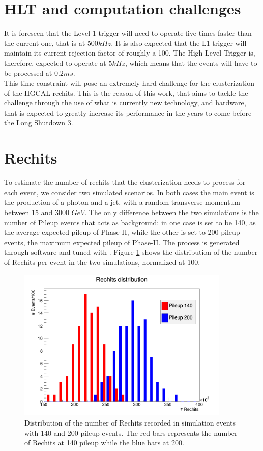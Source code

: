 \section{HLT and computation challenges}
It is foreseen that the Level 1 trigger will need to operate five times faster than the current one, that is at $500 \unit{kHz}$. It is also expected that the L1 trigger will maintain its current rejection factor of roughly a 100. The High Level Trigger is, therefore, expected to operate at $5 \unit{kHz}$, which means that the events will have to be processed at $0.2 \unit{ms}$.\\
This time constraint will pose an extremely hard challenge for the clusterization of the HGCAL rechits. This is the reason of this work, that aims to tackle the challenge through the use of what is currently new technology, and hardware, that is expected to greatly increase its performance in the years to come before the Long Shutdown 3.

\section{Rechits}
To estimate the number of rechits that the clusterization needs to process for each event, we consider two simulated scenarios.
In both cases the main event is the production of a photon and a jet, with a random transverse momentum between 15 and 3000 $\unit{GeV}$. The only difference between the two simulations is the number of Pileup events that acts as background: in one case is set to be 140, as the average expected pileup of Phase-II, while the other is set to 200 pileup events, the maximum expected pileup of Phase-II.
The process is generated through  software and tuned with . Figure \ref{rechitsHisto} shows the distribution of the number of Rechits per event in the two simulations, normalized at 100.
\clearpage

\begin{figure}
\centerline{\includegraphics[width=0.9\textwidth]{intro/rechitsHisto.png}}
\caption{Distribution of the number of Rechits recorded in simulation events with 140 and 200 pileup events. The red bars represents the number of Rechits at 140 pileup while the blue bars at 200.}
\label{rechitsHisto}
\end{figure}


